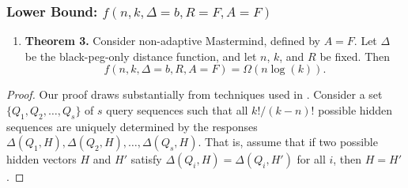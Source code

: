 \documentclass[12pt, a4paper]{article}
\begin{document}
\subsubsection{Lower Bound: $f(n, k, \Delta=b, R=F, A=F)$}
\begin{enumerate}[label=]
	\item\textbf{Theorem 3.} Consider non-adaptive Mastermind, defined by $A=F$. Let $\Delta$ be the black-peg-only distance function, and let $n$, $k$, and $R$ be fixed. Then
	\begin{equation*}
	f(n, k, \Delta = b, R, A=F)=\Omega(n\log(k)).
	\end{equation*}
\end{enumerate}

\begin{proof}
	Our proof draws substantially from techniques used in \cite{DS13}. Consider a set $\{Q_1, Q_2, \ldots, Q_s\}$ of $s$ query sequences such that all $k!/(k-n)!$ possible hidden sequences are uniquely determined by the responses $\Delta(Q_1, H), \Delta(Q_2, H), \ldots, \Delta(Q_s, H)$. That is, assume that if two possible hidden vectors $H$ and $H'$ satisfy $\Delta(Q_i, H) = \Delta(Q_i, H')$ for all $i$, then $H = H'$.


\end{proof}
\end{document}
